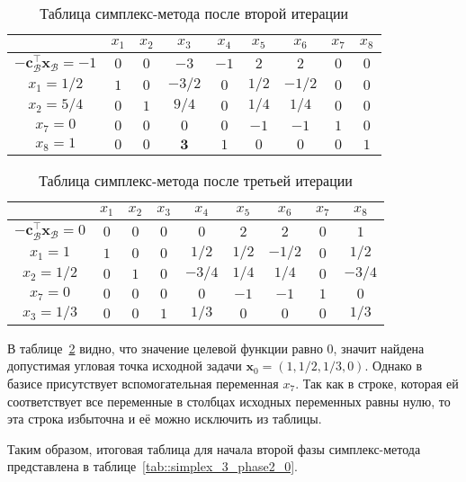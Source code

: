 \documentclass[12pt]{article}
\newcommand{\bx}{\mathbf{x}}
\begin{document}
\begin{table}[!ht]
\centering
\caption{Таблица симплекс-метода после второй итерации}
\begin{tabular}{|c|cccccccc|}
\hline
& $x_1$ & $x_2$ & $x_3$ & $x_4$ & $x_5$ & $x_6$ & $x_7$ & $x_8$\\
\hline
$-\mathbf{c}_{\mathcal{B}}^{\top}\bx_{\mathcal{B}} = -1$ & $0$ & $0$ & $-3$ & $-1$ & $2$ & $2$ & $0$ & $0$ \\
\hline
$x_1 = 1/2$ & $1$ & $0$ & $-3/2$ & $0$ & $1/2$ & $-1/2$ & $0$ & $0$ \\
$x_2 = 5/4$ & $0$ & $1$ & $9/4$ & $0$ & $1/4$ & $1/4$ & $0$ & $0$ \\
$x_7 = 0$ & $0$ & $0$ & $0$ & $0$ & $-1$ & $-1$ & $1$ & $0$ \\
$x_8 = 1$ & $0$ & $0$ & $\mathbf{3}$ & $1$ & $0$ & $0$ & $0$ & $1$\\
\hline
\end{tabular}
\label{tab::simplex_32}
\end{table}

\begin{table}[!ht]
\centering
\caption{Таблица симплекс-метода после третьей итерации}
\begin{tabular}{|c|cccccccc|}
\hline
& $x_1$ & $x_2$ & $x_3$ & $x_4$ & $x_5$ & $x_6$ & $x_7$ & $x_8$\\
\hline
$-\mathbf{c}_{\mathcal{B}}^{\top}\bx_{\mathcal{B}} = 0$ & $0$ & $0$ & $0$ & $0$ & $2$ & $2$ & $0$ & $1$ \\
\hline
$x_1 = 1$ & $1$ & $0$ & $0$ & $1/2$ & $1/2$ & $-1/2$ & $0$ & $1/2$ \\
$x_2 = 1/2$ & $0$ & $1$ & $0$ & $-3/4$ & $1/4$ & $1/4$ & $0$ & $-3/4$ \\
$x_7 = 0$ & $0$ & $0$ & $0$ & $0$ & $-1$ & $-1$ & $1$ & $0$ \\
$x_3 = 1/3$ & $0$ & $0$ & $1$ & $1/3$ & $0$ & $0$ & $0$ & $1/3$\\
\hline
\end{tabular}
\label{tab::simplex_33}
\end{table}

В таблице~\ref{tab::simplex_33} видно, что значение целевой функции равно 0, значит найдена допустимая угловая точка исходной задачи $\bx_0 = (1, 1/2, 1/3, 0)$.
Однако в базисе присутствует вспомогательная переменная $x_7$.
Так как в строке, которая ей соответствует все переменные в столбцах исходных переменных равны нулю, то эта строка избыточна и её можно исключить из таблицы.

Таким образом, итоговая таблица для начала второй фазы симплекс-метода представлена в таблице~\ref{tab::simplex_3_phase2_0}.
\end{document}
